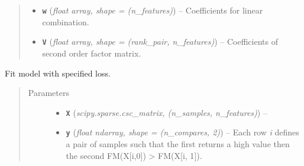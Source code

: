 \documentclass[letterpaper,10pt,english]{sphinxmanual}
\begin{document}
\begin{fulllineitems}
\begin{quote}
\begin{description}
\begin{itemize}
\item {} 
\textbf{\texttt{w}} (\emph{float \textbar{} array, shape = (n\_features)}) -- Coefficients for linear combination.

\item {} 
\textbf{\texttt{V}} (\emph{float \textbar{} array, shape = (rank\_pair, n\_features)}) -- Coefficients of second order factor matrix.

\end{itemize}

\end{description}\end{quote}

\begin{fulllineitems}
\label{api:fastFM.bpr.FMRecommender.fit}
Fit model with specified loss.
\begin{quote}\begin{description}
\item[{Parameters}] \leavevmode\begin{itemize}
\item {} 
\textbf{\texttt{X}} (\emph{scipy.sparse.csc\_matrix, (n\_samples, n\_features)}) -- 

\item {} 
\textbf{\texttt{y}} (\emph{float \textbar{} ndarray, shape = (n\_compares, 2)}) -- Each row \emph{i} defines a pair of samples such that
the first returns a high value then the second
FM(X{[}i,0{]}) \textgreater{} FM(X{[}i, 1{]}).

\end{itemize}

\end{description}\end{quote}

\end{fulllineitems}


\end{fulllineitems}


\begin{thebibliography}{SIGIR2011}
\end{thebibliography}
\end{document}
